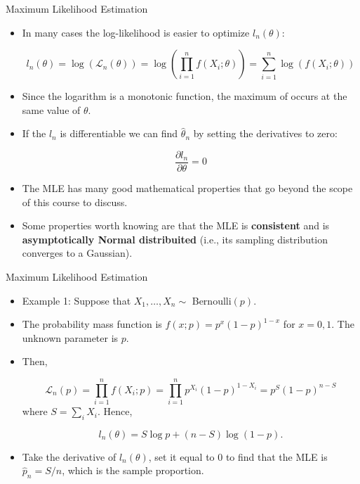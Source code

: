\documentclass[handout]{beamer}
\begin{document}
\begin{frame}{Maximum Likelihood Estimation}
\scriptsize{
\begin{itemize}
 \item In many cases the log-likelihood is easier to optimize $l_n(\theta)$:
 
 \begin{displaymath}
l_n(\theta) = \log(\mathcal{L}_{n}(\theta))=\log(\prod_{i=1}^nf(X_i;\theta))= \sum_{i=1}^{n}\log(f(X_i;\theta))  
 \end{displaymath} 

\item Since the logarithm is a monotonic function, the maximum of occurs at the same value of $\theta$.
 
\item If the $l_n$ is differentiable we can find   $\hat{\theta}_n$ by setting the derivatives to zero:

\begin{displaymath}
 \frac{\partial l_n}{\partial \theta} = 0
\end{displaymath}

\item The MLE has many good mathematical properties that go beyond the scope of this course to discuss.

\item Some properties worth knowing are that the MLE is \textbf{consistent} and is \textbf{asymptotically Normal distribuited} (i.e., its sampling distribution converges to a Gaussian).

\end{itemize}


} 
 
\end{frame}


\begin{frame}{Maximum Likelihood Estimation}
\scriptsize{
\begin{itemize}
 \item Example 1: Suppose that $X_1,\dots, X_n \sim$  Bernoulli$(p)$. 
 \item The probability mass function is $f(x;p)= p^x(1- p)^{1-x}$ for $x = 0,1$. The unknown parameter is $p$. 
 \item Then,
 
 \begin{displaymath}
\mathcal{L}_{n}(p)=\prod_{i=1}^nf(X_i;p) = \prod_{i=1}^np^{X_i}(1-p)^{1-X_i}=p^S(1-p)^{n-S} 
 \end{displaymath} 
where $S=\sum_{i}X_i$. Hence, 
 
 \begin{displaymath}
l_n(\theta) = S\log p+ (n-S)\log(1-p). 
 \end{displaymath}  
 
\item Take the derivative of $l_n(\theta)$, set it equal to 0 to find that the MLE is $\hat{p}_n =S/n$, which is the sample proportion.

 
\end{itemize}


} 
 
\end{frame}
\end{document}
